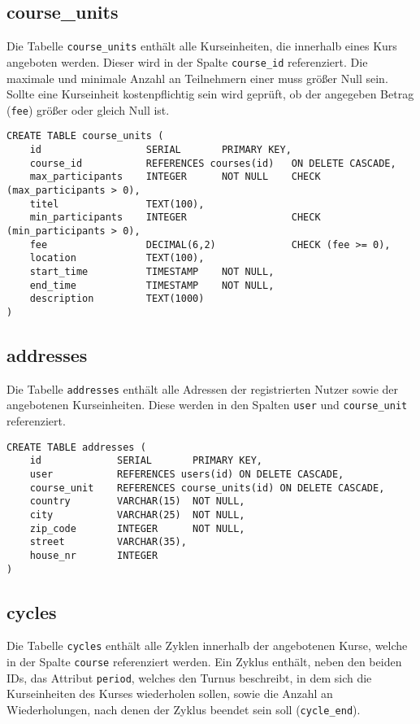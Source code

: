 \subsection{course\_units}
Die Tabelle \texttt{course\_units} enthält alle Kurseinheiten, die innerhalb eines Kurs angeboten werden. Dieser wird in der Spalte \texttt{course\_id} referenziert. Die maximale und minimale Anzahl an Teilnehmern einer muss größer Null sein. Sollte eine Kurseinheit kostenpflichtig sein wird geprüft, ob der angegeben Betrag (\texttt{fee}) größer oder gleich Null ist.

\begin{verbatim}
CREATE TABLE course_units (
    id                  SERIAL       PRIMARY KEY,
    course_id           REFERENCES courses(id)   ON DELETE CASCADE,
    max_participants    INTEGER      NOT NULL    CHECK (max_participants > 0),
    titel               TEXT(100),
    min_participants    INTEGER                  CHECK (min_participants > 0),
    fee                 DECIMAL(6,2)             CHECK (fee >= 0),
    location            TEXT(100),
    start_time          TIMESTAMP    NOT NULL,
    end_time            TIMESTAMP    NOT NULL,
    description         TEXT(1000)
)
\end{verbatim}

\subsection{addresses}
Die Tabelle \texttt{addresses} enthält alle Adressen der registrierten Nutzer sowie der angebotenen Kurseinheiten. Diese werden in den Spalten \texttt{user} und \texttt{course\_unit} referenziert.

\begin{verbatim}
CREATE TABLE addresses (
    id             SERIAL       PRIMARY KEY,
    user           REFERENCES users(id) ON DELETE CASCADE,
    course_unit    REFERENCES course_units(id) ON DELETE CASCADE,
    country        VARCHAR(15)  NOT NULL,
    city           VARCHAR(25)  NOT NULL,
    zip_code       INTEGER      NOT NULL,
    street         VARCHAR(35),
    house_nr       INTEGER
)
\end{verbatim}

\subsection{cycles}
Die Tabelle \texttt{cycles} enthält alle Zyklen innerhalb der angebotenen Kurse, welche in der Spalte \texttt{course} referenziert werden. Ein Zyklus enthält, neben den beiden IDs, das Attribut \texttt{period}, welches den Turnus beschreibt, in dem sich die Kurseinheiten des Kurses wiederholen sollen, sowie die Anzahl an Wiederholungen, nach denen der Zyklus beendet sein soll (\texttt{cycle\_end}).

